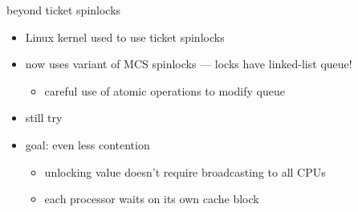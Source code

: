 \begin{frame}{beyond ticket spinlocks}
\begin{itemize}
\item Linux kernel used to use ticket spinlocks
\item now uses variant of MCS spinlocks --- locks have linked-list queue!
    \begin{itemize}
    \item careful use of atomic operations to modify queue
    \end{itemize}
\item still try 
\item goal: even less contention
    \begin{itemize}
    \item unlocking value doesn't require broadcasting to all CPUs
    \item each processor waits on its own cache block
    \end{itemize}
\end{itemize}
\end{frame}
